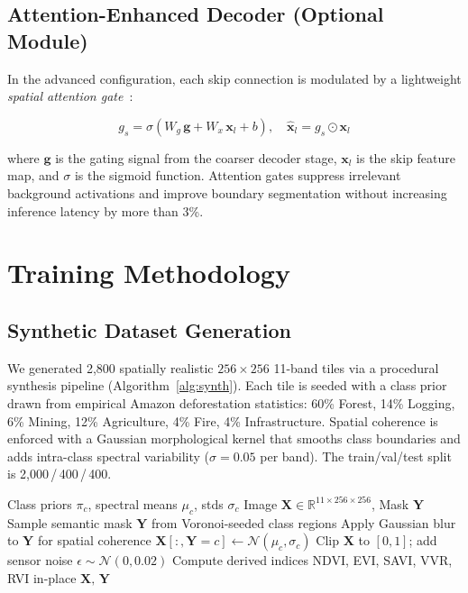 \documentclass[10pt,conference]{IEEEtran}
\begin{document}
\subsection{Attention-Enhanced Decoder (Optional Module)}

In the advanced configuration, each skip connection is modulated by a
lightweight \emph{spatial attention gate}~\cite{oktay2018attention}:

\begin{equation}
  g_s = \sigma\!\left(W_g\,\mathbf{g} + W_x\,\mathbf{x}_l + b\right),\quad
  \hat{\mathbf{x}}_l = g_s \odot \mathbf{x}_l
  \label{eq:attn_gate}
\end{equation}

\noindent where $\mathbf{g}$ is the gating signal from the coarser decoder
stage, $\mathbf{x}_l$ is the skip feature map, and $\sigma$ is the sigmoid
function. Attention gates suppress irrelevant background activations and
improve boundary segmentation without increasing inference latency by more
than 3\%.

\section{Training Methodology}
\label{sec:training}

\subsection{Synthetic Dataset Generation}

We generated 2,800 spatially realistic $256{\times}256$ 11-band tiles via a
procedural synthesis pipeline (Algorithm~\ref{alg:synth}). Each tile is seeded
with a class prior drawn from empirical Amazon deforestation statistics:
60\% Forest, 14\% Logging, 6\% Mining, 12\% Agriculture, 4\% Fire, 4\%
Infrastructure. Spatial coherence is enforced with a Gaussian morphological
kernel that smooths class boundaries and adds intra-class spectral variability
($\sigma{=}0.05$ per band). The train/val/test split is 2{,}000\,/\,400\,/\,400.

\begin{algorithm}[!t]
\caption{Synthetic 11-Band Tile Generator}
\label{alg:synth}
\begin{algorithmic}[1]
\REQUIRE Class priors $\pi_c$, spectral means $\mu_c$, stds $\sigma_c$
\ENSURE Image $\mathbf{X} \in \mathbb{R}^{11\times256\times256}$, Mask $\mathbf{Y}$
\STATE Sample semantic mask $\mathbf{Y}$ from Voronoi-seeded class regions
\STATE Apply Gaussian blur to $\mathbf{Y}$ for spatial coherence
  \STATE $\mathbf{X}[:,\mathbf{Y}{=}c] \leftarrow \mathcal{N}(\mu_c, \sigma_c)$
\ENDFOR
\STATE Clip $\mathbf{X}$ to $[0,1]$; add sensor noise $\epsilon \sim \mathcal{N}(0, 0.02)$
\STATE Compute derived indices NDVI, EVI, SAVI, VVR, RVI in-place
\RETURN $\mathbf{X},\, \mathbf{Y}$
\end{algorithmic}
\end{algorithm}
\end{document}
